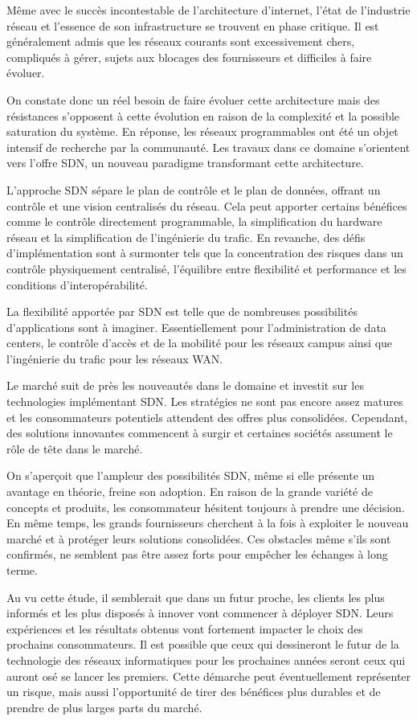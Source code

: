 
Même avec le succès incontestable de l'architecture d'internet, l'état de l'industrie réseau et l'essence de son infrastructure se trouvent en phase critique. Il est généralement admis que les réseaux courants sont excessivement chers, compliqués à gérer, sujets aux blocages des fournisseurs et difficiles à faire évoluer. 

On constate donc un réel besoin de faire évoluer cette architecture mais des résistances s'opposent à cette évolution en raison de la complexité et la possible saturation du système. En réponse, les réseaux programmables ont été un objet intensif de recherche par la communauté. Les travaux dans ce domaine s'orientent vers l'offre SDN, un nouveau paradigme transformant cette architecture.

L'approche SDN sépare le plan de contrôle et le plan de données, offrant un contrôle et une vision centralisés du réseau. Cela peut apporter certains bénéfices comme le contrôle directement programmable, la simplification du hardware réseau et la simplification de l'ingénierie du trafic. En revanche, des défis d'implémentation sont à surmonter tels que la concentration des risques dans un contrôle physiquement centralisé, l'équilibre entre flexibilité et performance et les conditions d'interopérabilité.

La flexibilité apportée par SDN est telle que de nombreuses possibilités d'applications sont à imaginer. Essentiellement pour l'administration de data centers, le contrôle d'accès et de la mobilité pour les réseaux campus ainsi que  l'ingénierie du trafic pour les réseaux WAN.

Le marché suit de près les nouveautés dans le domaine et investit sur les technologies implémentant SDN. Les stratégies ne sont pas encore assez matures et les consommateurs potentiels attendent des offres plus consolidées. Cependant, des solutions innovantes commencent à surgir et certaines sociétés assument le rôle de tête dans le marché.

On s'aperçoit que l'ampleur des possibilités SDN, même si elle présente un avantage en théorie, freine son adoption. En raison de la grande variété de concepts et produits, les consommateur hésitent toujours à prendre une décision. En même temps, les grands fournisseurs cherchent à la fois à exploiter le nouveau marché et à protéger leurs solutions consolidées. Ces obstacles même s'ils sont confirmés, ne semblent pas être assez forts pour empêcher les échanges à long terme.

Au vu cette étude, il semblerait que dans un futur proche, les clients les plus informés et les plus disposés à innover vont commencer à déployer SDN. Leurs expériences et les résultats obtenus  vont fortement impacter le choix des prochains consommateurs. Il est possible que  ceux qui dessineront le futur de la technologie des réseaux informatiques pour les prochaines années seront ceux qui auront osé se lancer les premiers. Cette démarche peut éventuellement représenter un risque, mais aussi l'opportunité de tirer des bénéfices plus durables et de prendre de plus larges parts du marché. 